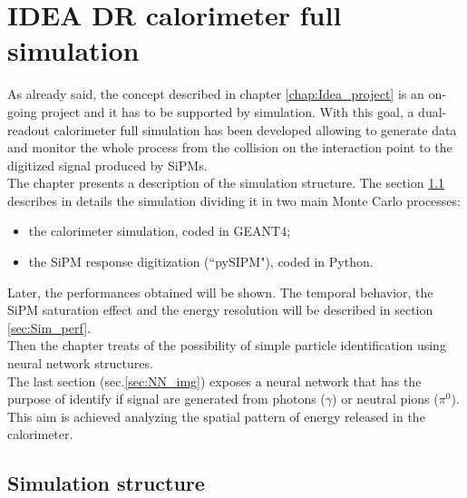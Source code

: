 \chapter{IDEA DR calorimeter full simulation}
As already said, the concept described in chapter \ref{chap:Idea_project} is an on-going project and it has to be supported by simulation.
With this goal, a dual-readout calorimeter full simulation has been developed allowing to generate data and monitor the whole process from the collision on the interaction point to the digitized signal produced by SiPMs.\\

The chapter presents a description of the simulation structure. The section \ref{sec:Sim_struc} describes in details the simulation dividing it in two main Monte Carlo processes:
\begin{itemize}
	\item the calorimeter simulation, coded in GEANT4;
	\item the SiPM response digitization (``pySIPM"), coded in Python.
\end{itemize}

Later, the performances obtained will be shown. The temporal behavior, the SiPM saturation effect and the energy resolution will be described in section \ref{sec:Sim_perf}.\\

Then the chapter treats of the possibility of simple particle identification using neural network structures.\\
The last section (sec.\ref{sec:NN_img})  exposes a neural network that has the purpose of identify if signal are generated from photons ($\gamma$) or neutral pions ($\pi^0$). This aim is achieved analyzing the spatial pattern of energy released in the calorimeter.

\section{Simulation structure} \label{sec:Sim_struc}


